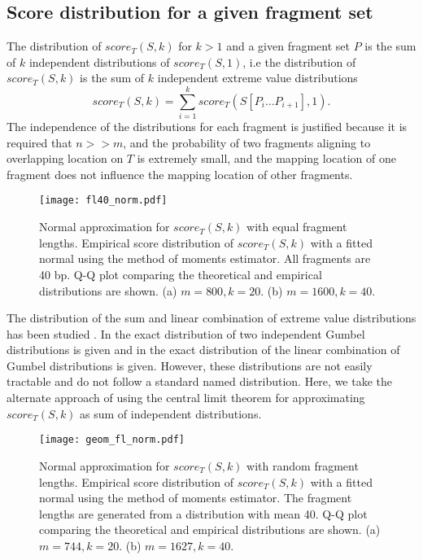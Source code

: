 \subsection{Score distribution for a given fragment set}
The distribution of $score_T(S,k)$ for $k > 1$ and a given fragment set
$P$ is the sum of $k$ independent distributions of $score_T(S,1)$, i.e
the distribution of $score_T(S,k)$ is the sum of $k$ independent extreme
value distributions \[score_T(S,k) = \sum_{i=1}^{k} score_T(S[P_i \dots
P_{i+1}], 1).\]
The independence of the distributions for each fragment is justified
because it is required that $n >> m$, and the probability of two
fragments aligning to overlapping location on $T$ is extremely small,
and the mapping location of one fragment does not influence the mapping
location of other fragments.

\begin{figure}[t!]
\centering
\texttt{[image: fl40\_norm.pdf]}
\caption[Normal approximation for $score_T(S,k)$ with equal fragment
  lengths]{
  Normal approximation for $score_T(S,k)$ with equal fragment lengths.
  Empirical score distribution of $score_T(S,k)$ with a fitted
  normal using the method of moments estimator. All fragments are 40 bp.
  Q-Q plot comparing the theoretical and empirical distributions are shown.
  (a) $m=800, k=20$.
  (b) $m=1600, k=40$.}
\label{norm_const}
\end{figure}

The distribution of the sum and linear combination of extreme value
distributions has been studied \citep{cetinkaya2001scalable,
marques2015distribution,loaiciga1999analysis,nadarajah2008exact}.  In
\cite{loaiciga1999analysis} the exact distribution of two independent
Gumbel distributions is given and in \cite{nadarajah2008exact} the exact
distribution of the linear combination of Gumbel distributions is given.
%
However, these distributions are not easily tractable and do not follow
a standard named distribution. Here, we take the alternate approach of
using the central limit theorem for approximating $score_T(S,k)$ as sum
of independent distributions.

\begin{figure}[t!]
\centering
\texttt{[image: geom\_fl\_norm.pdf]}
\caption[Normal approximation for $score_T(S,k)$ with random fragment
  lengths]{
  Normal approximation for $score_T(S,k)$ with random fragment lengths.
  Empirical score distribution of $score_T(S,k)$ with a fitted
  normal using the method of moments estimator. The fragment lengths are
  generated from a distribution with mean 40. Q-Q plot comparing
  the theoretical and empirical distributions are shown.
  (a) $m=744, k=20$.
  (b) $m=1627, k=40$.}
\label{norm_geom}
\end{figure}

